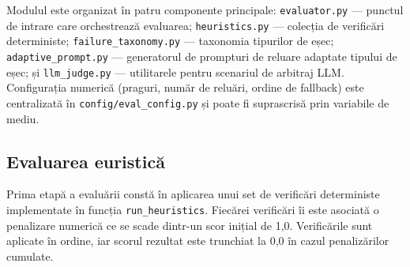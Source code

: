 \documentclass[12pt, a4paper, oneside, romanian]{teza-upb}
\begin{document}
Modulul este organizat în patru componente principale: \texttt{evaluator.py} — punctul de intrare care orchestrează evaluarea; \texttt{heuristics.py} — colecția de verificări deterministe; \texttt{failure\_taxonomy.py} — taxonomia tipurilor de eșec; \texttt{adaptive\_prompt.py} — generatorul de prompturi de reluare adaptate tipului de eșec; și \texttt{llm\_judge.py} — utilitarele pentru scenariul de arbitraj LLM. Configurația numerică (praguri, număr de reluări, ordine de fallback) este centralizată în \texttt{config/eval\_config.py} și poate fi suprascrisă prin variabile de mediu.

\subsection{Evaluarea euristică}

Prima etapă a evaluării constă în aplicarea unui set de verificări deterministe implementate în funcția \texttt{run\_heuristics}. Fiecărei verificări îi este asociată o penalizare numerică ce se scade dintr-un scor inițial de 1,0. Verificările sunt aplicate în ordine, iar scorul rezultat este trunchiat la 0,0 în cazul penalizărilor cumulate.
\end{document}
